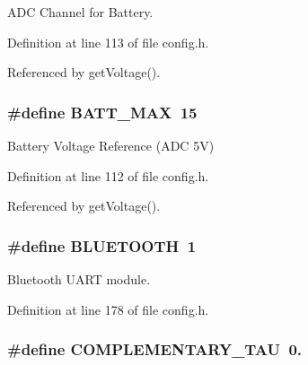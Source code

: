 A\-D\-C Channel for Battery. 



Definition at line 113 of file config.\-h.



Referenced by get\-Voltage().

\hypertarget{group__config_gac873c87f494ea2b22e7eb5fc74ad5a82}{
\subsubsection[{B\-A\-T\-T\-\_\-\-M\-A\-X}]{\setlength{\rightskip}{0pt plus 5cm}\#define B\-A\-T\-T\-\_\-\-M\-A\-X~15}}\label{group__config_gac873c87f494ea2b22e7eb5fc74ad5a82}


Battery Voltage Reference (A\-D\-C 5\-V) 



Definition at line 112 of file config.\-h.



Referenced by get\-Voltage().

\hypertarget{group__config_ga3f30897fa8435dc9811642367a328be8}{
\subsubsection[{B\-L\-U\-E\-T\-O\-O\-T\-H}]{\setlength{\rightskip}{0pt plus 5cm}\#define B\-L\-U\-E\-T\-O\-O\-T\-H~1}}\label{group__config_ga3f30897fa8435dc9811642367a328be8}


Bluetooth U\-A\-R\-T module. 



Definition at line 178 of file config.\-h.

\hypertarget{group__config_ga61cd22949cc88bd899de6b20cb61e959}{
\subsubsection[{C\-O\-M\-P\-L\-E\-M\-E\-N\-T\-A\-R\-Y\-\_\-\-T\-A\-U}]{\setlength{\rightskip}{0pt plus 5cm}\#define C\-O\-M\-P\-L\-E\-M\-E\-N\-T\-A\-R\-Y\-\_\-\-T\-A\-U~0.}}\label{group__config_ga61cd22949cc88bd899de6b20cb61e959}


